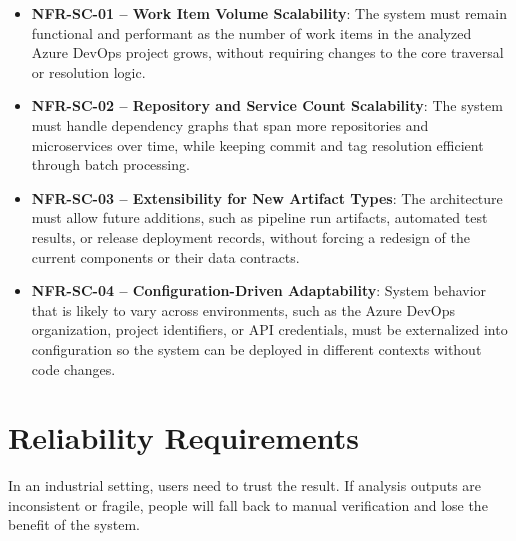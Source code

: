 \begin{itemize}
  \item \textbf{NFR-SC-01 -- Work Item Volume Scalability}: The system must remain functional and performant as the number of work items in the analyzed Azure DevOps project grows, without requiring changes to the core traversal or resolution logic.

  \item \textbf{NFR-SC-02 -- Repository and Service Count Scalability}: The system must handle dependency graphs that span more repositories and microservices over time, while keeping commit and tag resolution efficient through batch processing.

  \item \textbf{NFR-SC-03 -- Extensibility for New Artifact Types}: The architecture must allow future additions, such as pipeline run artifacts, automated test results, or release deployment records, without forcing a redesign of the current components or their data contracts.

  \item \textbf{NFR-SC-04 -- Configuration-Driven Adaptability}: System behavior that is likely to vary across environments, such as the Azure DevOps organization, project identifiers, or API credentials, must be externalized into configuration so the system can be deployed in different contexts without code changes.
\end{itemize}

\section{Reliability Requirements}
\label{sec:req-reliability}

In an industrial setting, users need to trust the result. If analysis outputs are
inconsistent or fragile, people will fall back to manual verification and lose
the benefit of the system.

